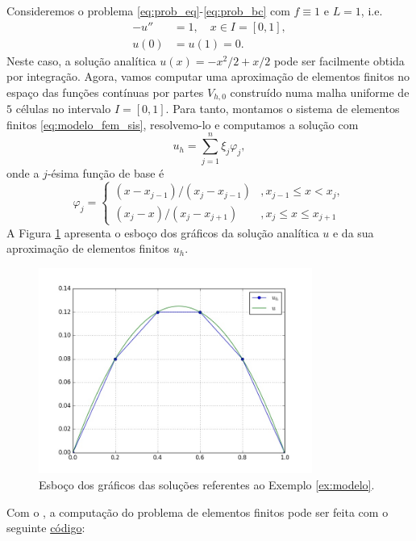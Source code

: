 \begin{ex}\label{ex:modelo}
  Consideremos o problema \eqref{eq:prob_eq}-\eqref{eq:prob_bc} com $f\equiv 1$ e $L=1$, i.e.
  \begin{align}
    -u'' &= 1,\quad x\in I=[0,1],\label{eq:ex_modelo_eq}\\
    u(0) &= u(1) = 0.\label{eq:ex_modelo_bc}
  \end{align}
Neste caso, a solução analítica $u(x) = -x^2/2+x/2$ pode ser facilmente obtida por integração. Agora, vamos computar uma aproximação de elementos finitos no espaço das funções contínuas por partes $V_{h,0}$ construído numa malha uniforme de $5$ células no intervalo $I=[0, 1]$. Para tanto, montamos o sistema de elementos finitos \eqref{eq:modelo_fem_sis}, resolvemo-lo e computamos a solução com
\begin{equation}
  u_h = \sum_{j=1}^n \xi_j\varphi_j,
\end{equation}
onde a $j$-ésima função de base é
\begin{equation}
  \varphi_j = \left\{
      \begin{array}{ll}
        (x-x_{j-1})/(x_j - x_{j-1}) &, x_{j-1}\leq x < x_{j},\\
        (x_{j}-x)/(x_j-x_{j+1}) &, x_j \leq x \leq x_{j+1}
      \end{array}
\right.
\end{equation}
A Figura \ref{fig:ex_modelo} apresenta o esboço dos gráficos da solução analítica $u$ e da sua aproximação de elementos finitos $u_h$.

\begin{figure}[h!]
  \centering
  \includegraphics[width=0.8\textwidth]{./cap_mef1d/dados/ex_modelo/ex_modelo}
  \caption{Esboço dos gráficos das soluções referentes ao Exemplo \ref{ex:modelo}.}
  \label{fig:ex_modelo}
\end{figure}

\ifispython
Com o \fenics, a computação do problema de elementos finitos pode ser feita com o seguinte \href{https://github.com/phkonzen/notas/blob/master/src/MetodoElementosFinitos/cap_mef1d/dados/ex_modelo/ex_modelo.py}{código}:

\fi
\end{ex}

